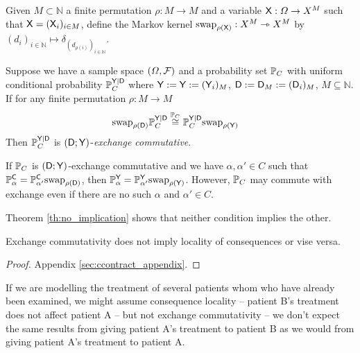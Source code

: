\begin{definition}
Given $M\subset \mathbb{N}$ a finite permutation $\rho:M\to M$ and a variable $\mathsf{X}:\Omega\to X^M$ such that $\mathsf{X}=(\mathsf{X}_i)_{i\in M}$, define the Markov kernel $\text{swap}_{\rho(\mathsf{X})}:X^M\rightarrowtriangle X^M$ by $(d_i)_{i\in\mathbb{N}}\mapsto \delta_{(d_{\rho(i)})_{i\in\mathbb{N}}}$.
\end{definition}

\begin{definition}\label{def:caus_exch}
Suppose we have a sample space $(\Omega,\mathcal{F})$ and a probability set $\mathbb{P}_C$ with uniform conditional probability $\mathbb{P}_C^{\mathsf{Y}|\mathsf{D}}$ where $\mathsf{Y}:=\mathsf{Y}:=(\mathsf{Y}_i)_{M}$, $\mathsf{D}:=\mathsf{D}_M:=(\mathsf{D}_i)_M$, $M\subseteq \mathbb{N}$. If for any finite permutation $\rho:M\to M$
\begin{align}
    \text{swap}_{\rho(\mathsf{D})} \mathbb{P}_{C}^{\mathsf{Y}|\mathsf{D}} &\overset{\mathbb{P}_C}{\cong} \mathbb{P}_{C}^{\mathsf{Y}|\mathsf{D}}\text{swap}_{\rho(\mathsf{Y})}
\end{align}
Then $\mathbb{P}_C^{\mathsf{Y}|\mathsf{D}}$ is $(\mathsf{D};\mathsf{Y})$-\emph{exchange commutative}.
\end{definition}

If $\mathbb{P}_C$ is $(\mathsf{D};\mathsf{Y})$-exchange commutative and we have $\alpha,\alpha'\in C$ such that $\mathbb{P}_\alpha^{\mathsf{C}} = \mathbb{P}_{\alpha'}^{\mathsf{C}}\text{swap}_{\rho(\mathsf{D})}$, then $\mathbb{P}_\alpha^{\mathsf{Y}} = \mathbb{P}_{\alpha'}^{\mathsf{Y}}\text{swap}_{\rho(\mathsf{Y})}$. However, $\mathbb{P}_C$ may commute with exchange even if there are no such $\alpha$ and $\alpha'\in C$.

Theorem \ref{th:no_implication} shows that neither condition implies the other. 

\begin{theorem}\label{th:no_implication}
Exchange commutativity does not imply locality of consequences or vise versa.
\end{theorem}

\begin{proof}
Appendix \ref{sec:ccontract_appendix}.
\end{proof}

If we are modelling the treatment of several patients whom who have already been examined, we might assume consequence locality -- patient B's treatment does not affect patient A -- but not exchange commutativity -- we don't expect the same results from giving patient A's treatment to patient B as we would from giving patient A's treatment to patient A. 

